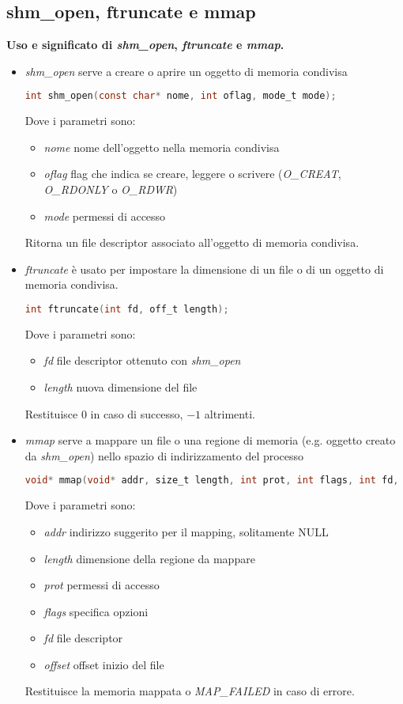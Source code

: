 \subsection{shm\_open, ftruncate e mmap}
\textbf{Uso e significato di \textit{shm\_open}, \textit{ftruncate} e \textit{mmap}.}\\
\begin{itemize}
	\item \textit{shm\_open} serve a creare o aprire un oggetto di memoria condivisa
	\begin{lstlisting}[language=C]
		int shm_open(const char* nome, int oflag, mode_t mode);
	\end{lstlisting}
	Dove i parametri sono:
	\begin{itemize}
		\item \textit{nome} nome dell'oggetto nella memoria condivisa
		\item \textit{oflag} flag che indica se creare, leggere o scrivere (\textit{O\_CREAT}, \textit{O\_RDONLY} o \textit{O\_RDWR})
		\item \textit{mode} permessi di accesso
	\end{itemize}
	Ritorna un file descriptor associato all'oggetto di memoria condivisa.
	\item \textit{ftruncate} è usato per impostare la dimensione di un file o di un oggetto di memoria condivisa.
	\begin{lstlisting}[language=C]
		int ftruncate(int fd, off_t length);
	\end{lstlisting}
	Dove i parametri sono:
	\begin{itemize}
		\item \textit{fd} file descriptor ottenuto con \textit{shm\_open}
		\item \textit{length} nuova dimensione del file
	\end{itemize}
	Restituisce $0$ in caso di successo, $-1$ altrimenti.
	\item \textit{mmap} serve a mappare un file o una regione di memoria (e.g. oggetto creato da \textit{shm\_open}) nello spazio di indirizzamento del processo
	\begin{lstlisting}[language=C]
		void* mmap(void* addr, size_t length, int prot, int flags, int fd, off_t offset);
	\end{lstlisting}
	Dove i parametri sono:
	\begin{itemize}
		\item \textit{addr} indirizzo suggerito per il mapping, solitamente NULL
		\item \textit{length} dimensione della regione da mappare
		\item \textit{prot} permessi di accesso
		\item \textit{flags} specifica opzioni
		\item \textit{fd} file descriptor
		\item \textit{offset} offset inizio del file
	\end{itemize}
	Restituisce la memoria mappata o \textit{MAP\_FAILED} in caso di errore.
\end{itemize}

